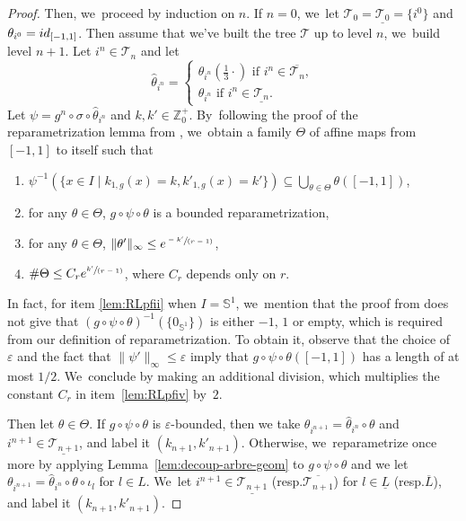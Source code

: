 \documentclass[11pt]{article}
\newcommand{\resp}{resp.\xspace}
\newenvironment{enumeratei}
{\bgroup\def\theenumi{\roman{enumi}}\def\theenumii{\arabic{enumii}}\begin{enumerate}}
{\end{enumerate}\egroup}
\newcommand{\spfrac}[2]{\sfrac{#1}{(#2)}}
\newcommand{\id}{\textup{id}}
\theoremstyle{definition}
\newcommand{\bbS}{{\mathbb{S}}}
\newcommand{\bbZ}{{\mathbb{Z}}}
\begin{document}
\begin{proof}
Then, we~proceed by induction on $n$.
If $n=0$, we~let $\mathcal{T}_0 = \underline{\mathcal{T}_0} = \{ i^0 \}$ and $\theta_{i^0} = \id_{[-1, 1]}$.
Then assume that we've built the tree $\mathcal{T}$ up to level $n$, we~build level $n+1$.
Let $i^n \in \mathcal{T}_n$ and let
\[
\hat{\theta}_{i^n} = \begin{cases}
\theta_{i^n} \left (\frac{1}{3} \cdot \right) \text{ if } i^n \in \overline{\mathcal{T}_n},\\
\theta_{i^n} \text{ if } i^n \in \underline{\mathcal{T}_n}.
\end{cases}
\]
Let $\psi = g^n \circ \sigma \circ \hat{\theta}_{i^n}$ and $k,k' \in \bbZ_0^+$. By~following the proof of the reparametrization lemma from \cite{MR4701884}, we~obtain a family $\Theta$ of affine maps from $[-1,1]$ to itself such that
\begin{enumeratei}
\item\label{lem:RLpfi}
$\psi^{-1} \left (\{ x \in I \mid k_{1,g}(x)=k, k'_{1,g}(x)=k'\} \right)\subseteq \bigcup_{\theta\in \Theta} \theta([-1,1])$,
\item\label{lem:RLpfii}
for any $\theta \in \Theta$, $g \circ \psi \circ \theta$ is a bounded reparametrization,
\item\label{lem:RLpfiii}
for any $\theta \in \Theta$, $\| \theta' \|_{\infty}\leq e^{\spfrac{-k'}{r-1}}$,
\item\label{lem:RLpfiv}
$\# \Theta\leq C_r e^{\spfrac{k'}{r-1}}$, where $C_r$ depends only on $r$.
\end{enumeratei}
In fact, for item \eqref{lem:RLpfii} when $I = \bbS^1$, we~mention that the proof from \cite{MR4701884} does not give that $(g \circ \psi \circ \theta)^{-1} (\{ 0_{\bbS^1} \})$ is either $-1$, $1$ or empty, which is required from our definition of reparametrization.
To obtain it, observe that the choice of $\varepsilon$ and the fact that $\| \psi' \|_{\infty} \leq \varepsilon$ imply that $g \circ \psi \circ \theta([-1,1])$ has a length of at most $1/2$. We~conclude by making an additional division, which multiplies the constant $C_r$ in item~\eqref{lem:RLpfiv} by~$2$.

Then let $\theta \in \Theta$. If $g \circ \psi \circ \theta$ is $\varepsilon$-bounded, then we take $\theta_{i^{n+1}} = \hat{\theta}_{i^n} \circ \theta$ and $i^{n+1} \in \underline{\mathcal{T}_{n+1}}$, and label it $(k_{n+1},k'_{n+1})$.
Otherwise, we~reparametrize once more by applying Lemma~\ref{lem:decoup-arbre-geom} to $g \circ \psi \circ \theta$ and we let $\theta_{i^{n+1}} = \hat{\theta}_{i^n} \circ \theta \circ \iota_l$ for $l \in L$. We~let $i^{n+1} \in \underline{\mathcal{T}_{n+1}}$ (\resp $\overline{\mathcal{T}_{n+1}}$) for $l \in \underline{L}$ (\resp $\overline{L}$), and label it $(k_{n+1},k'_{n+1})$.


\end{proof}
\end{document}
